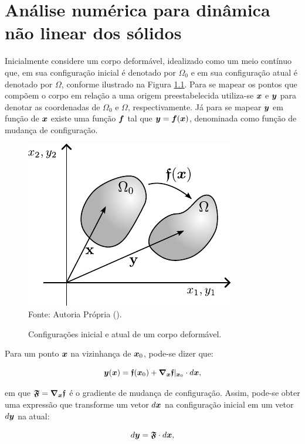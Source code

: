 \chapter{Análise numérica para dinâmica não linear dos sólidos} \label{EGDS}

Inicialmente considere um corpo deformável, idealizado como um meio contínuo que, em sua configuração inicial é denotado por $\Omega_0$ e em sua configuração atual é denotado por $\Omega$, conforme ilustrado na Figura \ref{fig:Cont}. Para se mapear os pontos que compõem o corpo em relação a uma origem preestabelecida utiliza-se $\boldsymbol{x}$ e $\boldsymbol{y}$ para denotar as coordenadas de $\Omega_0$ e $\Omega$, respectivamente. Já para se mapear $\boldsymbol{y}$ em função de $\boldsymbol{x}$ existe uma função $\boldsymbol{f}$ tal que $\boldsymbol{y}=\boldsymbol{f}(\boldsymbol{x})$, denominada como função de mudança de configuração.

\begin{figure}[h!]
    \centering
    \caption{Configurações inicial e atual de um corpo deformável.}
    \includegraphics[width=.4\linewidth]{Figuras/Cont.pdf}
    \\Fonte: Autoria Própria (\the\year).
    \label{fig:Cont}
\end{figure}

Para um ponto $\boldsymbol{x}$ na vizinhança de $\boldsymbol{x}_0$, pode-se dizer que:

\begin{equation}
    \boldsymbol{y}(\boldsymbol{x})=\boldsymbol{\mathfrak{f}}(\boldsymbol{x}_0)+\boldsymbol{\nabla_x}\boldsymbol{\mathfrak{f}}|_{\boldsymbol{x}_0}\cdot d\boldsymbol{x}\text{,}
\end{equation}

\noindent em que $\boldsymbol{\mathfrak{F}}=\boldsymbol{\nabla_x}\boldsymbol{\mathfrak{f}}$ é o gradiente de mudança de configuração. Assim, pode-se obter uma expressão que transforme um vetor $d\boldsymbol{x}$ na configuração inicial em um vetor $d\boldsymbol{y}$ na atual:

\begin{equation}
    d\boldsymbol{y}=\boldsymbol{\mathfrak{F}}\cdot d\boldsymbol{x}\text{,}\label{eq:dyAdx}
\end{equation}

